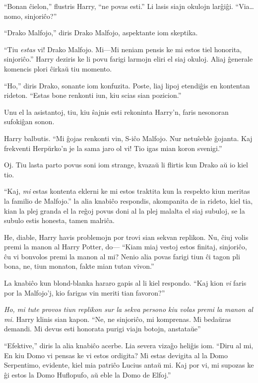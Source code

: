 ``Bonan ĉielon,'' flustris Harry, ``ne povas esti.'' Li lasis siajn
okulojn larĝiĝi. ``Via\ldots nomo, sinjoriĉo?''

``Drako Malfojo,'' diris Drako Malfojo, aspektante iom skeptika.

``Tiu \emph{estas} vi! Drako Malfojo. Mi—Mi neniam pensis ke mi estos
tiel honorita, sinjoriĉo.'' Harry deziris ke li povu farigi larmojn
eliri el siaj okuloj. Aliaj ĝenerale komencis plori ĉirkaŭ tiu momento.

``Ho,'' diris Drako, sonante iom konfuzita. Poste, liaj lipoj etendiĝis en
kontentan rideton. ``Estas bone renkonti iun, kiu scias sian pozicion.''

Unu el la asistantoj, tiu, kiu ŝajnis esti rekoninta Harry'n, faris
nesonoran sufokiĝan sonon.

Harry balbutis. ``Mi ĝojas renkonti vin, S-iĉo Malfojo. Nur netuŝeble
ĝojanta. Kaj frekventi Herpŭrko'n je la sama jaro ol vi! Tio igas mian
koron svenigi.''

Oj. Tiu lasta parto povus soni iom strange, kvazaŭ li flirtis kun
Drako aŭ io kiel tio.

``Kaj, \emph{mi} estas kontenta eklerni ke mi estos traktita kun la
respekto kiun meritas la familio de Malfojo.'' la alia knabiĉo
respondis, akompanita de ia rideto, kiel tia, kian la plej granda el
la reĝoj povus doni al la plej malalta el siaj subuloj, se la subulo
estis honesta, tamen malriĉa.

He, diable, Harry havis problemojn por trovi sian sekvan replikon. Nu,
ĉiuj volis premi la manon al Harry Potter, do— ``Kiam miaj vestoj
estos finitaj, sinjoriĉo, ĉu vi bonvolos premi la manon al mi? Nenio
alia povas farigi tiun ĉi tagon pli bona, ne, tiun monaton, fakte mian
tutan vivon.''

La knabiĉo kun blond-blanka hararo gapis al li kiel respondo. ``Kaj kion
\emph{vi} faris por la Malfojo'j, kio farigas vin meriti tian favoron?''

\emph{Ho, mi tute provos tiun replikon sur la sekva persono kiu volas
premi la manon al mi.} Harry klinis sian kapon. ``Ne, ne sinjoriĉo, mi
komprenas. Mi bedaŭras demandi. Mi devus esti honorata purigi
viajn botojn, anstataŭe''

``Efektive,'' diris la alia knabiĉo acerbe. Lia severa vizaĝo heliĝis
iom. ``Diru al mi, En kiu Domo vi pensas ke vi estos ordigita? Mi
estas devigita al la Domo Serpentimo, evidente, kiel mia patriĉo Lucius
antaŭ mi. Kaj por vi, mi supozas ke ĝi estos la Domo Huflopufo, aŭ eble
la Domo de Elfoj.''

